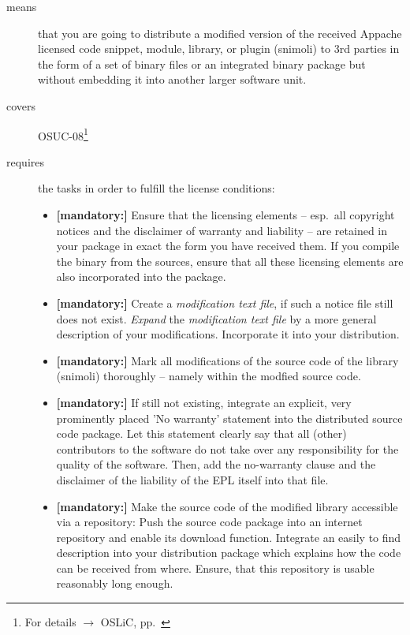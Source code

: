 \begin{description}
\item[means] that you are going to distribute a modified version of the received
Appache licensed code snippet, module, library, or plugin (snimoli) to 3rd
parties in the form of a set of binary files or an integrated binary package but
without embedding it into another larger software unit.
\item[covers] OSUC-08\footnote{For details $\rightarrow$ OSLiC, pp.\ \pageref{OSUC-08-DEF}}
\item[requires] the tasks in order to fulfill the license conditions:
\begin{itemize}

  \item \textbf{[mandatory:]} Ensure that the licensing elements -- esp.\ all
  copyright notices and the disclaimer of warranty and liability -- are retained
  in your package in exact the form you have received them. If you compile the
  binary from the sources, ensure that all these licensing elements are also
  incorporated into the package.

  \item \textbf{[mandatory:]} Create a \emph{modification text file}, if such a
  notice file still does not exist. \emph{Expand} the \emph{modification text
  file} by a more general description of your modifications. Incorporate it into
  your distribution.

  \item \textbf{[mandatory:]} Mark all modifications of the source code of the
  library (snimoli) thoroughly -- namely within the modfied source code.

  \item \textbf{[mandatory:]} If still not existing, integrate an explicit, very
  prominently placed 'No warranty' statement into the distributed source code
  package. Let this statement clearly say that all (other) contributors to the
  software do not take over any responsibility for the quality of the software.
  Then, add the no-warranty clause and the disclaimer of the liability of the
  EPL itself into that file.
  
  \item \textbf{[mandatory:]} Make the source code of the modified library
  accessible via a repository: Push the source code package into an internet
  repository and enable its download function. Integrate an easily to find
  description into your distribution package which explains how the code can be
  received from where. Ensure, that this repository is usable reasonably long
  enough.
  

\end{itemize}
\end{description}
